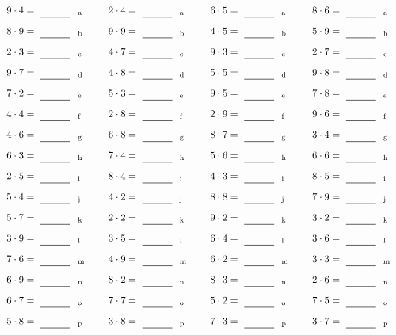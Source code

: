 \documentclass
[
  draft    = true,
  fontsize = 11pt,
  parskip  = half-
]
{scrartcl}
\begin{document}
\par\vfill\par
\begin{align*}
    \pline{9\cdot4}&=\rline{a}
  & \pline{2\cdot4}&=\rline{a}
  & \pline{6\cdot5}&=\rline{a}
  & \pline{8\cdot6}&=\rline{a} \\[1ex]
    \pline{8\cdot9}&=\rline{b}
  & \pline{9\cdot9}&=\rline{b}
  & \pline{4\cdot5}&=\rline{b}
  & \pline{5\cdot9}&=\rline{b} \\[1ex]
    \pline{2\cdot3}&=\rline{c}
  & \pline{4\cdot7}&=\rline{c}
  & \pline{9\cdot3}&=\rline{c}
  & \pline{2\cdot7}&=\rline{c} \\[1ex]
    \pline{9\cdot7}&=\rline{d}
  & \pline{4\cdot8}&=\rline{d}
  & \pline{5\cdot5}&=\rline{d}
  & \pline{9\cdot8}&=\rline{d} \\[1ex]
    \pline{7\cdot2}&=\rline{e}
  & \pline{5\cdot3}&=\rline{e}
  & \pline{9\cdot5}&=\rline{e}
  & \pline{7\cdot8}&=\rline{e} \\[1ex]
    \pline{4\cdot4}&=\rline{f}
  & \pline{2\cdot8}&=\rline{f}
  & \pline{2\cdot9}&=\rline{f}
  & \pline{9\cdot6}&=\rline{f} \\[1ex]
    \pline{4\cdot6}&=\rline{g}
  & \pline{6\cdot8}&=\rline{g}
  & \pline{8\cdot7}&=\rline{g}
  & \pline{3\cdot4}&=\rline{g} \\[1ex]
    \pline{6\cdot3}&=\rline{h}
  & \pline{7\cdot4}&=\rline{h}
  & \pline{5\cdot6}&=\rline{h}
  & \pline{6\cdot6}&=\rline{h} \\[1ex]
    \pline{2\cdot5}&=\rline{i}
  & \pline{8\cdot4}&=\rline{i}
  & \pline{4\cdot3}&=\rline{i}
  & \pline{8\cdot5}&=\rline{i} \\[1ex]
    \pline{5\cdot4}&=\rline{j}
  & \pline{4\cdot2}&=\rline{j}
  & \pline{8\cdot8}&=\rline{j}
  & \pline{7\cdot9}&=\rline{j} \\[1ex]
    \pline{5\cdot7}&=\rline{k}
  & \pline{2\cdot2}&=\rline{k}
  & \pline{9\cdot2}&=\rline{k}
  & \pline{3\cdot2}&=\rline{k} \\[1ex]
    \pline{3\cdot9}&=\rline{l}
  & \pline{3\cdot5}&=\rline{l}
  & \pline{6\cdot4}&=\rline{l}
  & \pline{3\cdot6}&=\rline{l} \\[1ex]
    \pline{7\cdot6}&=\rline{m}
  & \pline{4\cdot9}&=\rline{m}
  & \pline{6\cdot2}&=\rline{m}
  & \pline{3\cdot3}&=\rline{m} \\[1ex]
    \pline{6\cdot9}&=\rline{n}
  & \pline{8\cdot2}&=\rline{n}
  & \pline{8\cdot3}&=\rline{n}
  & \pline{2\cdot6}&=\rline{n} \\[1ex]
    \pline{6\cdot7}&=\rline{o}
  & \pline{7\cdot7}&=\rline{o}
  & \pline{5\cdot2}&=\rline{o}
  & \pline{7\cdot5}&=\rline{o} \\[1ex]
    \pline{5\cdot8}&=\rline{p}
  & \pline{3\cdot8}&=\rline{p}
  & \pline{7\cdot3}&=\rline{p}
  & \pline{3\cdot7}&=\rline{p}
\end{align*}
\end{document}
